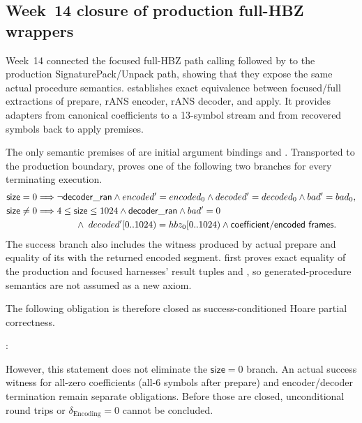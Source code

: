 \subsection{Week~14 closure of production full-HBZ wrappers}

Week~14 connected the focused full-HBZ path calling
 followed by 
to the production SignaturePack/Unpack path, showing that they expose the same
actual procedure semantics. 
establishes exact equivalence between focused/full extractions of prepare,
rANS encoder, rANS decoder, and apply. It provides adapters from canonical
coefficients to a 13-symbol stream and from recovered symbols back to apply premises.

The only semantic premises of
 are initial argument
bindings and . Transported to the production
boundary,  proves one
of the following two branches for every terminating execution.
\[
\begin{aligned}
  \mathsf{size}=0
    &\Longrightarrow \neg\mathsf{decoder\_ran}
      \land encoded'=encoded_0
      \land decoded'=decoded_0
      \land bad'=bad_0,\\
  \mathsf{size}\ne0
    &\Longrightarrow 4\le\mathsf{size}\le1024
      \land\mathsf{decoder\_ran}
      \land bad'=0\\
    &\hspace{4.2em}\land\;
      decoded'[0..1024)=hbz_0[0..1024)
      \land\mathsf{coefficient/encoded\ frames}.
\end{aligned}
\]
The success branch also includes the  witness
produced by actual prepare and equality of its 
with the returned encoded segment.
 first proves exact
equality of the production and focused harnesses' result tuples and
, so generated-procedure semantics are not assumed as a new axiom.

The following obligation is therefore closed as success-conditioned Hoare partial correctness.
\begin{center}
  : \statusproved
\end{center}
However, this statement does not eliminate the \(\mathsf{size}=0\) branch.
An actual success witness for all-zero coefficients (all-6 symbols after
prepare) and encoder/decoder termination remain separate obligations. Before
those are closed, unconditional round trips or \(\delta_{\mathrm{Encoding}}=0\)
cannot be concluded.

